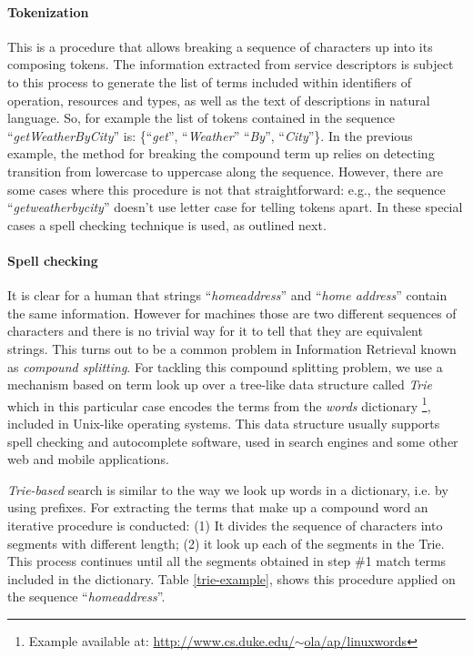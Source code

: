 \paragraph{Tokenization}
\label{parag:tokenization}
This is a procedure that allows breaking a sequence of characters up into its composing tokens. The information extracted from service descriptors is subject to this process to generate the list of terms included within identifiers of operation, resources and types, as well as the text of descriptions in natural language. So, for example the list of tokens contained in the sequence ``\emph{getWeatherByCity}'' is: \{\textquotedblleft{}\emph{get}\textquotedblright{}, \textquotedblleft{}\emph{Weather}\textquotedblright{} \textquotedblleft{}\emph{By}\textquotedblright{}, \textquotedblleft{}\emph{City}\textquotedblright{}\}. In the previous example, the method for breaking the compound term up relies on detecting transition from lowercase to uppercase along the sequence. However, there are some cases where this procedure is not that straightforward: e.g., the sequence ``\emph{getweatherbycity}'' doesn't use letter case for telling tokens apart. In these special cases a spell checking technique is used, as 
outlined next.


\paragraph{Spell checking}
\label{parag:spell-checking}
It is clear for a human that strings \textquotedblleft{}\emph{homeaddress}\textquotedblright{} and \textquotedblleft{}\emph{home address}\textquotedblright{} contain the same information. However for machines those are two different sequences of characters and there is no trivial way for it to tell that they are equivalent strings. This turns out to be a common problem in Information Retrieval \cite{Airio:2006} known as \emph{compound splitting}. For tackling this compound splitting problem, we use a mechanism based on term look up over a tree-like data structure called \emph{Trie} \cite{Fredkin:1960} which in this particular case encodes the terms from the \emph{words }dictionary \footnote{Example available at: \href{http://www.cs.duke.edu/~ola/ap/linuxwords}{http://www.cs.duke.edu/$\sim$ola/ap/linuxwords}}, included in Unix-like operating systems. This data structure usually supports spell checking and autocomplete software, used in search engines and some other web and mobile applications.

\emph{Trie-based }search is similar to the way we look up words in a dictionary, i.e. by using prefixes. For extracting the terms that make up a compound word an iterative procedure is conducted: (1) It divides the sequence of characters into segments with different length; (2) it look up each of the segments in the Trie. This process continues until all the segments obtained in step \#1 match terms included in the dictionary. Table \ref{trie-example}, shows this procedure applied on the sequence \textquotedblleft{}\emph{homeaddress}\textquotedblright{}.

